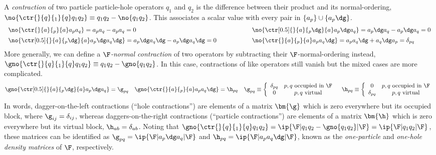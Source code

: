 \begin{dfn}\label{dfn:contraction}
A \textit{contraction} of two particle particle-hole operators $q_1$ and $q_2$ is the difference between their product and its normal-ordering, $\no{\ctr{}{q}{_1}{q}q_1q_2}\equiv q_1q_2 - \no{q_1q_2}$.
This associates a scalar value with every pair in $\{a_p\}\cup\{a_p\dg\}$.
\begin{align}
\begin{array}{l@{\hspace{2cm}}l}
  \no{\ctr{}{a}{_p}{a} a_pa_q}
=
  a_pa_q
-
  a_pa_q
=
  0
&
  \no{\ctr[0.5]{}{a}{_p\dg}{a} a_p\dg a_q}
=
  a_p\dg a_q
-
  a_p\dg a_q
=
  0
\\[5pt]
  \no{\ctr[0.5]{}{a}{_p\dg}{a} a_p\dg a_q\dg}
=
  a_p\dg a_q\dg
-
  a_p\dg a_q\dg
=
  0
&
  \no{\ctr{}{a}{_p}{a} a_p a_q\dg}
=
  a_p a_q\dg
+
  a_q\dg a_p
=
  \delta_{pq}
\end{array}
\end{align}
More generally, we can define a \textit{$\F$-normal contraction} of two operators by subtracting their $\F$-normal-ordering instead, $\gno{\ctr{}{q}{_1}{q}q_1q_2}\equiv q_1q_2 - \gno{q_1q_2}$.
In this case, contractions of like operators still vanish but the mixed cases are more complicated.
\begin{align}
  \gno{\ctr[0.5]{}{a}{_p\dg}{a} a_p\dg a_q}
=
  \g_{pq}
&&
  \gno{\ctr{}{a}{_p}{a} a_p a_q\dg}
=
  \h_{pq}
&&
  \g_{pq}
\equiv
\left\{
\begin{array}{cc}
\delta_{pq} & \text{$p,q$ occupied in $\F$} \\
0 & \text{$p,q$ virtual}
\end{array}
\right.
&&
  \h_{pq}
\equiv
\left\{
\begin{array}{cc}
0 & \text{$p,q$ occupied in $\F$} \\
\delta_{pq} & \text{$p,q$ virtual}
\end{array}
\right.
\end{align}
In words, dagger-on-the-left contractions (``hole contractions'') are elements of a matrix $\bm{\g}$ which is zero everywhere but its occupied block, where $\g_{ij}=\delta_{ij}$, whereas daggers-on-the-right contractions (``particle contractions'') are elements of a matrix $\bm{\h}$ which is zero everywhere but its virtual block, $\h_{ab}=\delta_{ab}$.
Noting that $\gno{\ctr{}{q}{_1}{q}q_1q_2}=\ip{\F|q_1q_2 - \gno{q_1q_2}|\F}=\ip{\F|q_1q_2|\F}$, these matrices can be identified as
$\g_{pq}=\ip{\F|a_p\dg a_q|\F}$
and
$\h_{pq}=\ip{\F|a_p a_q\dg|\F}$, known as the \textit{one-particle} and \textit{one-hole density matrices} of $\F$, respectively.
\end{dfn}


